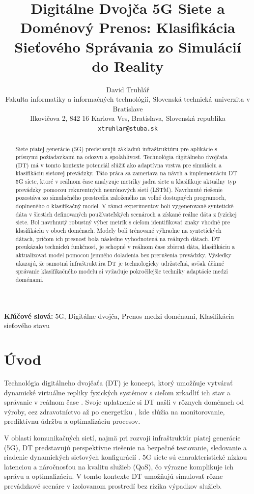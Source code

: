 \documentclass[a4paper,10pt]{ieeetran}
\title{Digitálne Dvojča 5G Siete a Doménový Prenos: Klasifikácia Sieťového Správania zo Simulácií do Reality}
\author{
David Truhlář \\
\small Fakulta informatiky a informačných technológií, Slovenská technická univerzita v Bratislave \\
\small Ilkovičova 2, 842 16 Karlova Ves, Bratislava, Slovenská republika \\
\small \texttt{xtruhlar@stuba.sk}
}
\newcommand{\keywords}[1]{\textbf{Kľúčové slová:} #1}
\begin{document}
\date{} %
\maketitle

\begin{abstract}
Siete piatej generácie (5G) predstavujú základnú infraštruktúru pre aplikácie s prísnymi požiadavkami na odozvu a spoľahlivosť. Technológia digitálneho dvojčaťa  (DT) má v tomto kontexte potenciál slúžiť ako adaptívna vrstva pre simuláciu a klasifikáciu sieťovej prevádzky. Táto práca sa zameriava na návrh a implementáciu DT 5G siete, ktoré v reálnom čase analyzuje metriky jadra siete a klasifikuje aktuálny typ prevádzky pomocou rekurentných neurónových sietí (LSTM). Navrhnuté riešenie pozostáva zo simulačného prostredia založeného na voľné dostupných programoch, doplneného o klasifikačný model. V rámci experimentov boli vygenerované syntetické dáta v šiestich definovaných používateľských scenároch a získané reálne dáta z fyzickej siete. Bol navrhnutý robustný výber metrík s cieľom identifikovať znaky vhodné pre klasifikáciu v oboch doménach. Modely boli trénované výhradne na syntetických dátach, pričom ich presnosť bola následne vyhodnotená na reálnych dátach. DT preukázalo technickú funkčnosť, je schopné v reálnom čase zbierať dáta, klasifikáciu a aktualizovať model pomocou jemného doladenia bez prerušenia prevádzky. Výsledky ukazujú, že samotná infraštruktúra DT je technologicky udržateľná, avšak účinné správanie klasifikačného modelu si vyžaduje pokročilejšie techniky adaptácie medzi doménami.
\end{abstract}

\keywords{5G, Digitálne dvojča, Prenos medzi doménami, Klasifikácia sieťového stavu}

\section{Úvod}
\label{sec_intro}
Technológia digitálneho dvojčaťa (DT) je koncept, ktorý umožňuje vytvárať dynamické virtuálne repliky fyzických systémov s cieľom zrkadliť ich stav a správanie v reálnom čase \cite{app_of_dt, real_time}. Svoje uplatnenie si DT našli v rôznych doménach  od výroby, cez zdravotníctvo až po energetiku \cite{AplicationsOfDT}, kde slúžia na monitorovanie, prediktívnu údržbu a optimalizáciu procesov.

V oblasti komunikačných sietí, najmä pri rozvoji infraštruktúr piatej generácie (5G), DT predstavujú perspektívne riešenie na bezpečné testovanie, sledovanie a riadenie dynamických sieťových konfigurácií \cite{AplicationsOfDT}. 5G siete sú charakteristické nízkou latenciou a náročnosťou na kvalitu služieb (QoS), čo výrazne komplikuje ich správu a optimalizáciu. V tomto kontexte DT umožňujú simulovať rôzne prevádzkové scenáre v izolovanom prostredí bez rizika výpadkov služieb.
\end{document}
